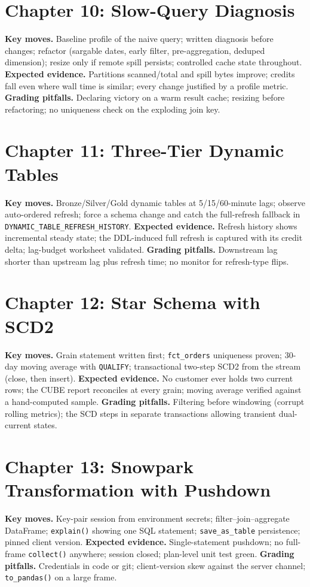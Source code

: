 \section{Chapter 10: Slow-Query Diagnosis}
\textbf{Key moves.} Baseline profile of the naive query; written diagnosis before changes; refactor (sargable dates, early filter, pre-aggregation, deduped dimension); resize only if remote spill persists; controlled cache state throughout.
\textbf{Expected evidence.} Partitions scanned/total and spill bytes improve; credits fall even where wall time is similar; every change justified by a profile metric.
\textbf{Grading pitfalls.} Declaring victory on a warm result cache; resizing before refactoring; no uniqueness check on the exploding join key.

\section{Chapter 11: Three-Tier Dynamic Tables}
\textbf{Key moves.} Bronze/Silver/Gold dynamic tables at 5/15/60-minute lags; observe auto-ordered refresh; force a schema change and catch the full-refresh fallback in \texttt{DYNAMIC\_TABLE\_REFRESH\_HISTORY}.
\textbf{Expected evidence.} Refresh history shows incremental steady state; the DDL-induced full refresh is captured with its credit delta; lag-budget worksheet validated.
\textbf{Grading pitfalls.} Downstream lag shorter than upstream lag plus refresh time; no monitor for refresh-type flips.

\section{Chapter 12: Star Schema with SCD2}
\textbf{Key moves.} Grain statement written first; \texttt{fct\_orders} uniqueness proven; 30-day moving average with \texttt{QUALIFY}; transactional two-step SCD2 from the stream (close, then insert).
\textbf{Expected evidence.} No customer ever holds two current rows; the CUBE report reconciles at every grain; moving average verified against a hand-computed sample.
\textbf{Grading pitfalls.} Filtering before windowing (corrupt rolling metrics); the SCD steps in separate transactions allowing transient dual-current states.

\section{Chapter 13: Snowpark Transformation with Pushdown}
\textbf{Key moves.} Key-pair session from environment secrets; filter--join--aggregate DataFrame; \texttt{explain()} showing one SQL statement; \texttt{save\_as\_table} persistence; pinned client version.
\textbf{Expected evidence.} Single-statement pushdown; no full-frame \texttt{collect()} anywhere; session closed; plan-level unit test green.
\textbf{Grading pitfalls.} Credentials in code or git; client-version skew against the server channel; \texttt{to\_pandas()} on a large frame.

